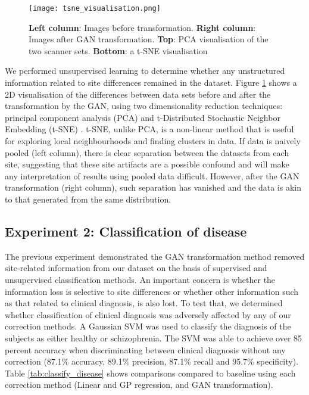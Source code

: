 \begin{figure}[!ht]
\begin{center}
 \texttt{[image: tsne\_visualisation.png]}
    \end{center}
  \caption{\textbf{Left column}: Images before transformation. \textbf{Right column}: Images after GAN transformation. \textbf{Top}: PCA visualisation of the two scanner sets. \textbf{Bottom}: a t-SNE visualisation}
  \label{fig:pca_tsne}
\end{figure}

We performed unsupervised learning to determine whether any unstructured information related to site differences remained in the dataset. Figure \ref{fig:pca_tsne} shows a 2D visualisation of the differences between data sets before and after the transformation by the GAN, using two dimensionality reduction techniques: principal component analysis (PCA) and t-Distributed Stochastic Neighbor Embedding (t-SNE) \citep{maaten2008visualizing}. t-SNE, unlike PCA, is a non-linear method that is useful for exploring local neighbourhoods and finding clusters in data. If data is naively pooled (left column), there is clear separation between the datasets from each site, suggesting that these site artifacts are a possible confound and will make any interpretation of results using pooled data difficult. However, after the GAN transformation (right column), such separation has vanished and the data is akin to that generated from the same distribution.

\subsection{Experiment 2: Classification of disease} \label{class_disease}
The previous experiment demonstrated the GAN transformation method removed site-related information from our dataset on the basis of supervised and unsupervised classification methods. An important concern is whether the information loss is selective to site differences or whether other information such as that related to clinical diagnosis, is also lost. To test that, we determined whether classification of clinical diagnosis was adversely affected by any of our correction methods. A Gaussian SVM was used to classify the diagnosis of the subjects as either healthy or schizophrenia. The SVM was able to achieve over 85 percent accuracy when discriminating between clinical diagnosis without any correction (87.1\% accuracy, 89.1\% precision, 87.1\% recall and 95.7\% specificity).   Table \ref{tab:classify_disease} shows comparisons compared to baseline using each correction method (Linear and GP regression, and GAN transformation).

